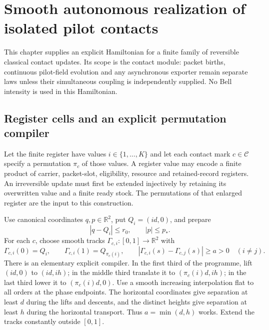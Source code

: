 \documentclass[11pt,oneside,openany]{book}
\theoremstyle{definition}
\theoremstyle{remark}\newtheorem{remark}[theorem]{Remark}
\begin{document}



\chapter{Smooth autonomous realization of isolated pilot contacts}\label{p:smooth}
\label{p:mech-section}

This chapter supplies an explicit Hamiltonian for a finite family of reversible
classical contact updates. Its scope is the contact module: packet births,
continuous pilot-field evolution and any asynchronous exporter remain separate
laws unless their simultaneous coupling is independently supplied. No Bell
intensity is used in this Hamiltonian.

\section{Register cells and an explicit permutation compiler}

Let the finite register have values $i\in\{1,\ldots,K\}$ and let each contact mark
$c\in\mathcal C$ specify a permutation $\pi_c$ of those values. A register value
may encode a finite product of carrier, packet-slot, eligibility, resource and
retained-record registers. An irreversible update must first be extended
injectively by retaining its overwritten value and a finite ready stock.
The permutations of that enlarged register are the input to this construction.

Use canonical coordinates $q,p\in\mathbb R^2$, put $Q_i=(id,0)$, and prepare
\begin{equation}\label{p:mech-cells}
 |q-Q_i|\le r_0,\qquad |p|\le p_*.
\end{equation}
For each $c$, choose smooth tracks $\Gamma_{c,i}:[0,1]\to\mathbb R^2$ with
\begin{equation}\label{p:mech-tracks}
 \Gamma_{c,i}(0)=Q_i,\qquad
 \Gamma_{c,i}(1)=Q_{\pi_c(i)},\qquad
 |\Gamma_{c,i}(s)-\Gamma_{c,j}(s)|\ge a>0\quad(i\ne j).
\end{equation}
There is an elementary explicit compiler. In the first third of the programme,
lift $(id,0)$ to $(id,ih)$; in the middle third translate it to
$(\pi_c(i)d,ih)$; in the last third lower it to $(\pi_c(i)d,0)$.
Use a smooth increasing interpolation flat to all orders at the phase endpoints.
The horizontal coordinates give separation at least $d$ during the lifts and
descents, and the distinct heights give separation at least $h$ during the
horizontal transport. Thus $a=\min(d,h)$ works. Extend the tracks constantly
outside $[0,1]$.
\end{document}
